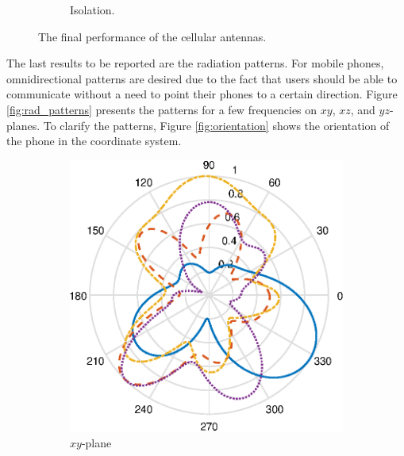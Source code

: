 \begin{figure}[H]
\begin{subfigure}[b]{0.49\textwidth}
        \caption{Isolation.}
        \label{fig:isolation}
    \end{subfigure}
    \caption{The final performance of the cellular antennas.}
    \label{fig:cell_perf_final}
\end{figure}

The last results to be reported are the radiation patterns. For mobile phones, omnidirectional patterns are desired due to the fact that users should be able to communicate without a need to point their phones to a certain direction. Figure \ref{fig:rad_patterns} presents the patterns for a few frequencies on $xy$, $xz$, and $yz$-planes. To clarify the patterns, Figure \ref{fig:orientation} shows the orientation of the phone in the coordinate system.

\begin{figure}[H]
    \centering
    \begin{subfigure}[b]{0.3\textwidth}
        \includegraphics[width=\textwidth]{img/ff_cell_xy.eps}
        \caption{$xy$-plane}
        \label{fig:ff_xy_cell}
    \end{subfigure}
    \begin{subfigure}[b]{0.3\textwidth}

\end{subfigure}
\end{figure}

